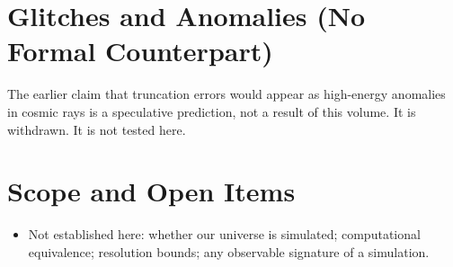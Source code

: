 \documentclass[11pt, a4paper]{article}
\begin{document}
\section{Glitches and Anomalies (No Formal Counterpart)}
The earlier claim that truncation errors would appear as high-energy anomalies in cosmic rays is a speculative prediction, not a result of this volume. It is withdrawn. It is not tested here.

\section{Scope and Open Items}
\begin{itemize}
  \item Not established here: whether our universe is simulated; computational equivalence; resolution bounds; any observable signature of a simulation.
\end{itemize}
\end{document}
